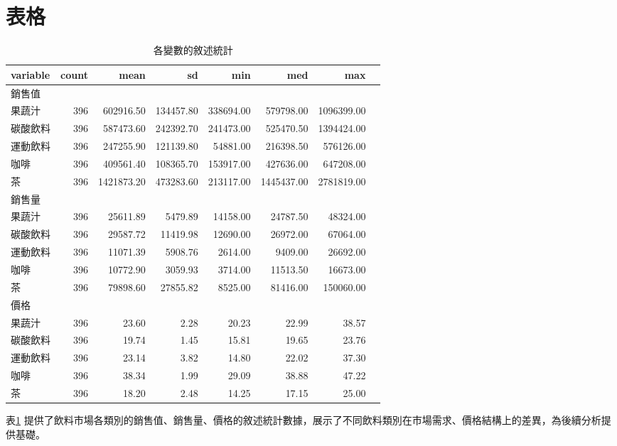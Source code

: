 
\section*{表格}

\vspace{-0.5em}
\begin{table}[H]
    \caption{各變數的敘述統計} \label{tab:summary_statistics}
    \centering
    \footnotesize
    \begin{tabular}{l r r r r r r r}
        \hline
        \textbf{variable} & \textbf{count} & \textbf{mean} & \textbf{sd} & \textbf{min} & \textbf{med} & \textbf{max} \\
        \hline
        銷售值 & & & & & & \\
        果蔬汁  & 396 & 602916.50 & 134457.80 & 338694.00 & 579798.00 & 1096399.00 \\
        碳酸飲料  & 396 & 587473.60 & 242392.70 & 241473.00 & 525470.50 & 1394424.00 \\
        運動飲料  & 396 & 247255.90 & 121139.80 & 54881.00 & 216398.50 & 576126.00 \\
        咖啡  & 396 & 409561.40 & 108365.70 & 153917.00 & 427636.00 & 647208.00 \\
        茶  & 396 & 1421873.20 & 473283.60 & 213117.00 & 1445437.00 & 2781819.00 \\
        銷售量 & & & & & & \\
        果蔬汁   & 396 & 25611.89 & 5479.89 & 14158.00 & 24787.50 & 48324.00 \\
        碳酸飲料   & 396 & 29587.72 & 11419.98 & 12690.00 & 26972.00 & 67064.00 \\
        運動飲料   & 396 & 11071.39 & 5908.76 & 2614.00 & 9409.00 & 26692.00 \\
        咖啡   & 396 & 10772.90 & 3059.93 & 3714.00 & 11513.50 & 16673.00 \\
        茶   & 396 & 79898.60 & 27855.82 & 8525.00 & 81416.00 & 150060.00 \\
        價格 & & & & & & \\
        果蔬汁 & 396 & 23.60 & 2.28 & 20.23 & 22.99 & 38.57 \\
        碳酸飲料 & 396 & 19.74 & 1.45 & 15.81 & 19.65 & 23.76 \\
        運動飲料 & 396 & 23.14 & 3.82 & 14.80 & 22.02 & 37.30 \\
        咖啡 & 396 & 38.34 & 1.99 & 29.09 & 38.88 & 47.22 \\
        茶 & 396 & 18.20 & 2.48 & 14.25 & 17.15 & 25.00 \\
        \hline
    \end{tabular}
\end{table}
\vspace{-1.5em}
\begin{singlespace}
    \begin{footnotesize}
        \raggedright
         表\ref{tab:summary_statistics} 提供了飲料市場各類別的銷售值、銷售量、價格的敘述統計數據，展示了不同飲料類別在市場需求、價格結構上的差異，為後續分析提供基礎。
    \end{footnotesize}
\end{singlespace}


